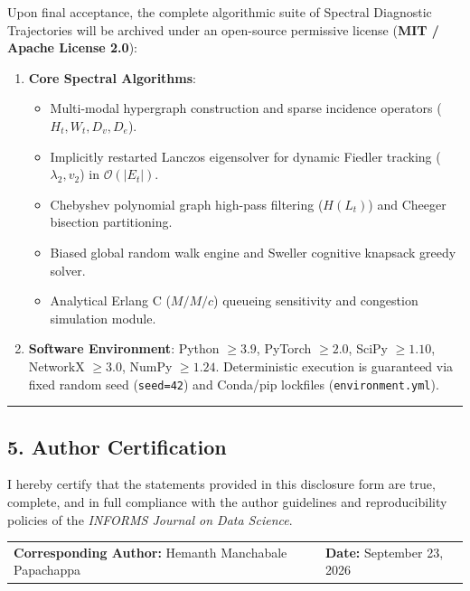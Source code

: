 \documentclass[11pt,letterpaper]{article}
\begin{document}
Upon final acceptance, the complete algorithmic suite of Spectral Diagnostic Trajectories will be archived under an open-source permissive license (\textbf{MIT / Apache License 2.0}):
\begin{enumerate}
    \item \textbf{Core Spectral Algorithms}:
    \begin{itemize}\setlength{\itemsep}{1pt}\setlength{\parskip}{0pt}
        \item Multi-modal hypergraph construction and sparse incidence operators ($H_t, W_t, D_v, D_e$).
        \item Implicitly restarted Lanczos eigensolver for dynamic Fiedler tracking ($\lambda_2, v_2$) in $\mathcal{O}(|E_t|)$.
        \item Chebyshev polynomial graph high-pass filtering ($H(L_t)$) and Cheeger bisection partitioning.
        \item Biased global random walk engine and Sweller cognitive knapsack greedy solver.
        \item Analytical Erlang C ($M/M/c$) queueing sensitivity and congestion simulation module.
    \end{itemize}
    \item \textbf{Software Environment}: Python $\ge 3.9$, PyTorch $\ge 2.0$, SciPy $\ge 1.10$, NetworkX $\ge 3.0$, NumPy $\ge 1.24$. Deterministic execution is guaranteed via fixed random seed (\texttt{seed=42}) and Conda/pip lockfiles (\texttt{environment.yml}).
\end{enumerate}

\vspace{12pt}
\hrule
\vspace{14pt}

\subsection*{5. Author Certification}

I hereby certify that the statements provided in this disclosure form are true, complete, and in full compliance with the author guidelines and reproducibility policies of the \textit{INFORMS Journal on Data Science}.

\vspace{24pt}

\begin{tabular*}{\textwidth}{@{\extracolsep{\fill}}ll}
    \textbf{Corresponding Author:} Hemanth Manchabale Papachappa & \textbf{Date:} September 23, 2026 \\
\end{tabular*}
\end{document}
